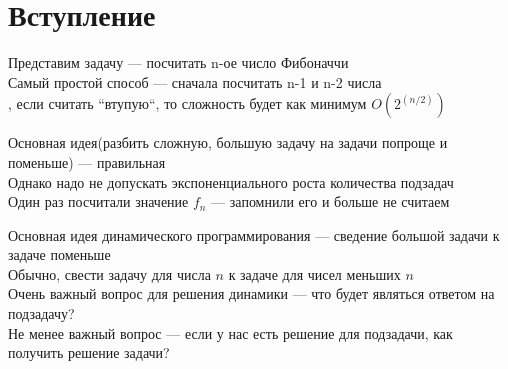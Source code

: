 \section{Вступление}

\begin{frame}
    Представим задачу --- посчитать n-ое число Фибоначчи\\
    Самый простой способ --- сначала посчитать n-1 и n-2 числа\\
    , если считать ``втупую``, то сложность будет как минимум $O(2^(n/2))$
\end{frame}

\begin{frame}
    Основная идея(разбить сложную, большую задачу на задачи попроще и поменьше) --- правильная\\
    Однако надо не допускать экспоненциального роста количества подзадач\\
    \quad Один раз посчитали значение $f_n$ --- запомнили его и больше не считаем
\end{frame}

\begin{frame}
    Основная идея динамического программирования --- сведение большой задачи к задаче поменьше\\
    \quad Обычно, свести задачу для числа $n$ к задаче для чисел меньших $n$\\
    \quad Очень важный вопрос для решения динамики --- что будет являться ответом на подзадачу?\\
    \quad Не менее важный вопрос --- если у нас есть решение для подзадачи, как получить решение задачи?
\end{frame}

